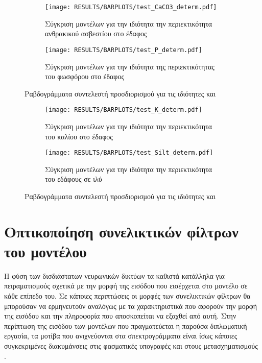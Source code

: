 \begin{figure}[H]
    \begin{subfigure}{0.5\textwidth}
        \texttt{[image: RESULTS/BARPLOTS/test\_CaCO3\_determ.pdf]}
        \caption{Σύγκριση μοντέλων για την ιδιότητα την περιεκτικότητα ανθρακικού ασβεστίου στο έδαφος}
        \label{fig:CaCO3_determ}
    \end{subfigure}
    \begin{subfigure}{0.5\textwidth}
        \texttt{[image: RESULTS/BARPLOTS/test\_P\_determ.pdf]}
        \caption{Σύγκριση μοντέλων για την ιδιότητα της περιεκτικότητας του φωσφόρου στο έδαφος}
        \label{fig:P_determ}
    \end{subfigure}
    \caption{Ραβδογράμματα συντελεστή προσδιορισμού για τις ιδιότητες  και }
\end{figure}
\begin{figure}[H]
    \begin{subfigure}{0.5\textwidth}
        \texttt{[image: RESULTS/BARPLOTS/test\_K\_determ.pdf]}
        \caption{Σύγκριση μοντέλων για την ιδιότητα την περιεκτικότητα του καλίου στο έδαφος}
        \label{fig:K_determ}
    \end{subfigure}
    \begin{subfigure}{0.5\textwidth}
        \texttt{[image: RESULTS/BARPLOTS/test\_Silt\_determ.pdf]}
        \caption{Σύγκριση μοντέλων για την ιδιότητα την περιεκτικότητα του εδάφους σε ιλύ}
        \label{fig:Silt_determ}
    \end{subfigure}
    \caption{Ραβδογράμματα συντελεστή προσδιορισμού για τις ιδιότητες  και }
\end{figure}


\section{Οπτικοποίηση συνελικτικών φίλτρων του μοντέλου}
Η φύση των δισδιάστατων νευρωνικών δικτύων τα καθιστά κατάλληλα για πειραματισμούς σχετικά με την μορφή της εισόδου που εισέρχεται στο μοντέλο σε κάθε επίπεδο του. Σε κάποιες περιπτώσεις οι μορφές των συνελικτικών φίλτρων θα μπορούσαν να ερμηνευτούν αναλόγως με τα χαρακτηριστικά που αφορούν την μορφή της εισόδου και την πληροφορία που αποσκοπείται να εξαχθεί από αυτή. Στην περίπτωση της εισόδου των μοντέλων που πραγματεύεται η παρούσα διπλωματική εργασία, τα μοτίβα που ανιχνεύονται στα σπεκτρογράμματα είναι ίσως κάποιες συγκεκριμένες διακυμάνσεις στις φασματικές υπογραφές και στους μετασχηματισμούς .

